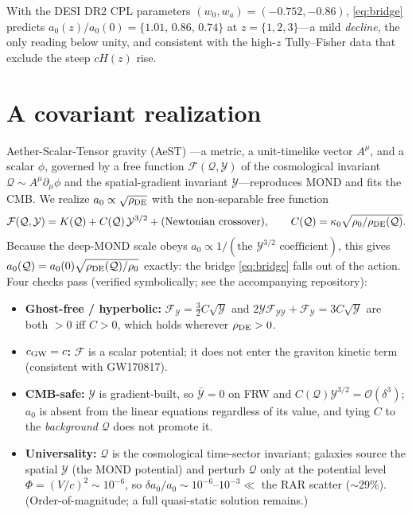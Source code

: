 \documentclass[11pt]{article}
\newcommand{\az}{a_0}
\newcommand{\rde}{\rho_{\rm DE}}
\begin{document}
With the DESI DR2 \cite{DESI2025} CPL parameters $(w_0,w_a)=(-0.752,-0.86)$, \eqref{eq:bridge} predicts
$\az(z)/\az(0)=\{1.01,\,0.86,\,0.74\}$ at $z=\{1,2,3\}$---a mild \emph{decline}, the only reading below unity, and
consistent with the high-$z$ Tully--Fisher data that exclude the steep $cH(z)$ rise.

\section{A covariant realization}
\label{sec:aest}
Aether-Scalar-Tensor gravity (AeST) \cite{SkordisZlosnik2021}---a metric, a unit-timelike vector $A^\mu$, and a
scalar $\phi$, governed by a free function $\mathcal{F}(\mathcal{Q},\mathcal{Y})$ of the cosmological invariant
$\mathcal{Q}\sim A^\mu\partial_\mu\phi$ and the spatial-gradient invariant $\mathcal{Y}$---reproduces MOND and fits
the CMB. We realize $\az\propto\sqrt{\rde}$ with the non-separable free function
\begin{equation}
\mathcal{F}(\mathcal{Q},\mathcal{Y}) = K(\mathcal{Q}) + C(\mathcal{Q})\,\mathcal{Y}^{3/2} + (\text{Newtonian
crossover}),\qquad C(\mathcal{Q}) = \kappa_0\sqrt{\rho_0/\rde(\mathcal{Q})}.
\end{equation}
Because the deep-MOND scale obeys $\az\propto1/(\text{the }\mathcal{Y}^{3/2}\text{ coefficient})$, this gives
$\az(\mathcal{Q})=\az(0)\sqrt{\rde(\mathcal{Q})/\rho_0}$ exactly: the bridge \eqref{eq:bridge} falls out of the
action. Four checks pass (verified symbolically; see the accompanying repository):
\begin{itemize}\itemsep1pt
\item \textbf{Ghost-free / hyperbolic:} $\mathcal{F}_{\mathcal{Y}}=\tfrac32 C\sqrt{\mathcal{Y}}$ and
$2\mathcal{Y}\mathcal{F}_{\mathcal{Y}\mathcal{Y}}+\mathcal{F}_{\mathcal{Y}}=3C\sqrt{\mathcal{Y}}$ are both $>0$
iff $C>0$, which holds wherever $\rde>0$.
\item \textbf{$c_{\rm GW}=c$:} $\mathcal{F}$ is a scalar potential; it does not enter the graviton kinetic term
(consistent with GW170817).
\item \textbf{CMB-safe:} $\mathcal{Y}$ is gradient-built, so $\bar{\mathcal{Y}}=0$ on FRW and
$C(\mathcal{Q})\mathcal{Y}^{3/2}=\mathcal{O}(\delta^3)$; $\az$ is absent from the linear equations regardless of its
value, and tying $C$ to the \emph{background} $\mathcal{Q}$ does not promote it.
\item \textbf{Universality:} $\mathcal{Q}$ is the cosmological time-sector invariant; galaxies source the spatial
$\mathcal{Y}$ (the MOND potential) and perturb $\mathcal{Q}$ only at the potential level $\Phi=(V/c)^2\sim10^{-6}$,
so $\delta\az/\az\sim10^{-6}$--$10^{-3}\ll$ the RAR scatter ($\sim$29\%). (Order-of-magnitude; a full quasi-static
solution remains.)
\end{itemize}
\end{document}
